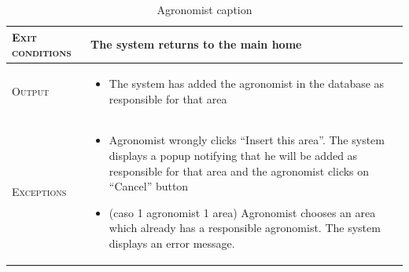 \begin{table}[H]
\begin{tabular}[c]{|l|p{}|}
        \textsc{Exit conditions}    &  The system returns to the main home\\
    	\hline %
    	\textsc{Output}             &  \begin{itemize}
    	    \item The system has added the agronomist in the database as responsible for that area
    	\end{itemize}\\
    	\hline %
    	\textsc{Exceptions}         &  \begin{itemize}
    	    \item Agronomist wrongly clicks “Insert this area”. The system displays a popup notifying that he will be added as responsible for that area and the agronomist clicks on “Cancel” button
    	    \item (caso 1 agronomist 1 area) Agronomist chooses an area which already has a responsible agronomist. The system displays an error message.
    	\end{itemize}\\
    	\hline %
        
    \end{tabular}
    \caption{\label{tab:responsible_area_insertion}Agronomist caption }
\end{table}

